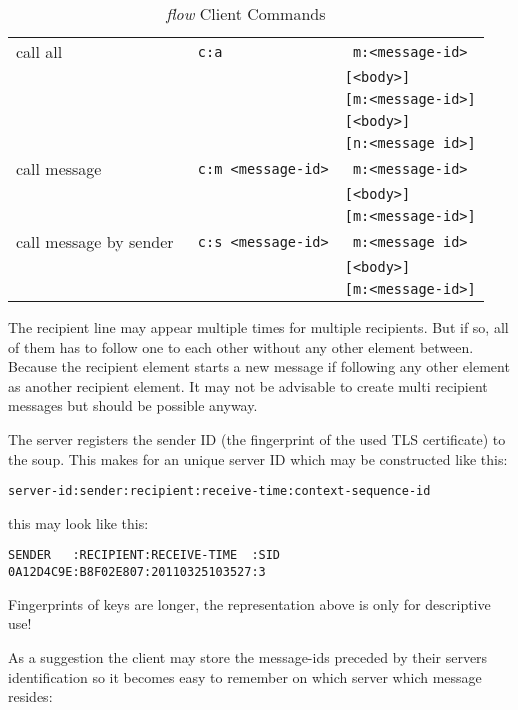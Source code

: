 \documentclass[twoside,a4paper,english,12pt,authoryear,openright]{book}
\newcommand{\flow}{\textit{flow} }
\begin{document}
\begin{table}[htdp]
\begin{center}
\begin{tabular}{ | l | l | l |  }
call all  & \texttt{ c:a}  &  \texttt{ m:<message-id>}  \\
&& \texttt{[<body>]}  \\
&&  \texttt{[m:<message-id>]}  \\
&& \texttt{[<body>]}  \\
&& \texttt{[n:<message id>]} \\
\hline

call message  & \texttt{ c:m <message-id>}  &  \texttt{ m:<message-id>}  \\
&& \texttt{[<body>]}  \\
&& \texttt{[m:<message-id>]}  \\
\hline

call message by sender & \texttt{ c:s <message-id>}  & \texttt{ m:<message id>}  \\
&& \texttt{[<body>]}  \\
&& \texttt{[m:<message-id>]}  \\
\hline


\end{tabular}
\end{center}
\caption{\flow Client Commands}
\label{default}
\end{table} %

The recipient line may appear multiple times for multiple recipients. But if so, all of them has to follow one to each other without any other element between. Because the recipient element starts a new message if following any other element as another recipient element. It may not be advisable to create multi recipient messages but should be possible anyway.

The server registers the sender ID (the fingerprint of the used TLS certificate) to the soup. This makes for an unique server ID which may be constructed like this:

\texttt{server-id:sender:recipient:receive-time:context-sequence-id}

this may look like this:

\begin{lstlisting}
SENDER   :RECIPIENT:RECEIVE-TIME  :SID
0A12D4C9E:B8F02E807:20110325103527:3
\end{lstlisting}

Fingerprints of keys are longer, the representation above is only for descriptive use!

As a suggestion the client may store the message-ids preceded  by their servers identification so it becomes easy to remember on which server which message resides: 
\end{document}
